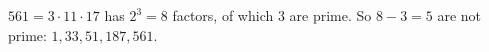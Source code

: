 $561=3\cdot11\cdot17$ has $2^3=8$ factors, of which $3$ are prime. So $8-3=\boxed{5}$ are not prime: $1,33,51,187,561$.
